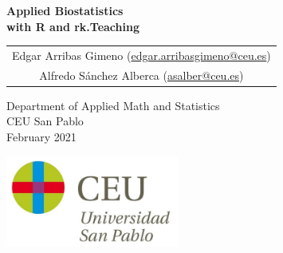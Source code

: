 \begin{titlepage}
\thispagestyle{empty}
\vspace*{7cm}
\par

\begin{center}
\normalfont\fontsize{30}{30}\selectfont
{\bfseries \color{blueceu}Applied Biostatistics\\ with R and rk.Teaching}
\end{center}
\vspace{1cm}

\begin{center}
\Large
\begin{tabular}{c}
Edgar Arribas Gimeno (\url{edgar.arribasgimeno@ceu.es})\\
Alfredo Sánchez Alberca (\url{asalber@ceu.es})\\
\end{tabular}

\medskip 
Department of Applied Math and Statistics\\ CEU San Pablo\\[1cm]
\medskip 
February 2021

\vspace{1cm}
\includegraphics[height=3cm]{img/logo_uspceu}
\end{center}
\vfill
\end{titlepage}